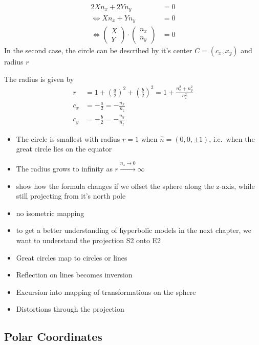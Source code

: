 \[\begin{split}
2Xn_x + 2Yn_y &= 0\\
\Leftrightarrow Xn_x + Yn_y &= 0 \\
\Leftrightarrow \begin{pmatrix}X\\ Y\end{pmatrix} \cdot \begin{pmatrix}n_x \\ n_y\end{pmatrix} &= 0
\end{split}\] In the second case, the circle can be described by it's
center \(C = (c_x, x_y)\) and radius \(r\)

The radius is given by \[\begin{split}
r &= 1 + \left(\frac{a}{2}\right)^2 + \left(\frac{b}{2}\right)^2 
= 1 + \frac{n_x^2+ n_y^2}{n_z^2}\\[1em]
c_x &= -\frac{a}{2} = -\frac{n_x}{n_z} \\[1em]
c_y &= -\frac{b}{2} = -\frac{n_y}{n_z}
\end{split}\]

\begin{itemize}
\item
  The circle is smallest with radius \(r=1\) when
  \(\hat n = (0, 0, \pm 1)\), i.e.~when the great circle lies on the
  equator
\item
  The radius grows to infinity as
  \(r \overset{n_z \rightarrow 0}\longrightarrow \infty\)
\item[$\square$]
  show how the formula changes if we offset the sphere along the z-axis,
  while still projecting from it's north pole
\item[$\square$]
  no isometric mapping
\item[$\square$]
  to get a better understanding of hyperbolic models in the next
  chapter, we want to understand the projection S2 onto E2
\item[$\square$]
  Great circles map to circles or lines
\item[$\square$]
  Reflection on lines becomes inversion
\item[$\square$]
  Excursion into mapping of transformations on the sphere
\item[$\square$]
  Distortions through the projection
\end{itemize}

\subsection{Polar Coordinates}\label{polar-coordinates}

